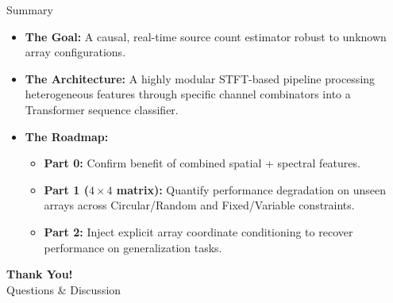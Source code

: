\documentclass[8pt,hyperref={pdfpagelabels=true},xcolor=table,aspectratio=169]{beamer}
\begin{document}
\begin{frame}{Summary}
    \begin{itemize}
        \item \textbf{The Goal:} A causal, real-time source count estimator robust to unknown array configurations.
        \item \textbf{The Architecture:} A highly modular STFT-based pipeline processing heterogeneous features through specific channel combinators into a Transformer sequence classifier.
        \item \textbf{The Roadmap:}
              \begin{itemize}
                  \item \textbf{Part 0:} Confirm benefit of combined spatial + spectral features.
                  \item \textbf{Part 1 ($4\times4$ matrix):} Quantify performance degradation on unseen arrays across Circular/Random and Fixed/Variable constraints.
                  \item \textbf{Part 2:} Inject explicit array coordinate conditioning to recover performance on generalization tasks.
              \end{itemize}
    \end{itemize}
    \vspace{2em}
    \begin{center}
        \textbf{Thank You!} \\
        Questions \& Discussion
    \end{center}
\end{frame}
\end{document}
